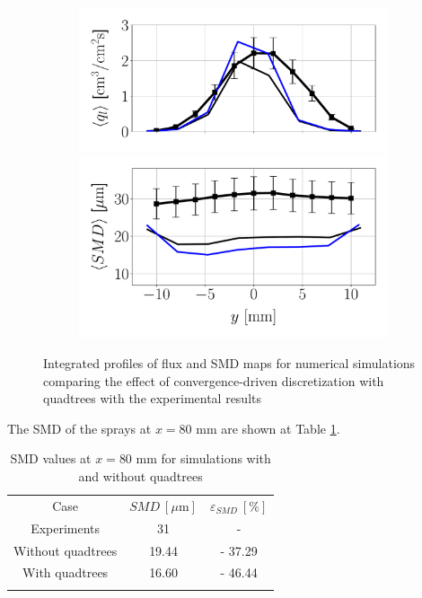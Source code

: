 \begin{figure}[h!]
\begin{subfigure}[b]{0.4\textwidth}
	\flushleft
   \includegraphics[scale=0.35]{./part2_developments/figures_ch6_lagrangian_JICF/params_quadtrees/profiles/flux_along_y}\\
   \vspace{-0.16in}
   \includegraphics[scale=0.35]{./part2_developments/figures_ch6_lagrangian_JICF/params_quadtrees/profiles/SMD_along_y}
\end{subfigure}

\caption{Integrated profiles of flux and SMD maps for numerical simulations comparing the effect of convergence-driven discretization with quadtrees with the experimental results}
\label{fig:profiles_LGS_JICF_quadtrees}
\end{figure}

The SMD of the sprays at $x = 80$ mm are shown at Table \ref{tab:SMD_deviations_quadtrees}. 

\begin{table}[!h]
\centering
\caption{SMD values at $x = 80$ mm for simulations with and without quadtrees}
\begin{tabular}{ccc}
\thickhline
Case & $SMD~\left[\mu \mathrm{m} \right]$ & $\varepsilon_{SMD}~\left[\% \right]$ \\
\thickhline
Experiments & 31 & - \\
Without quadtrees & 19.44 & - 37.29 \\
With quadtrees & 16.60 & - 46.44 \\
\thickhline
\end{tabular}
\label{tab:SMD_deviations_quadtrees}
\end{table}

